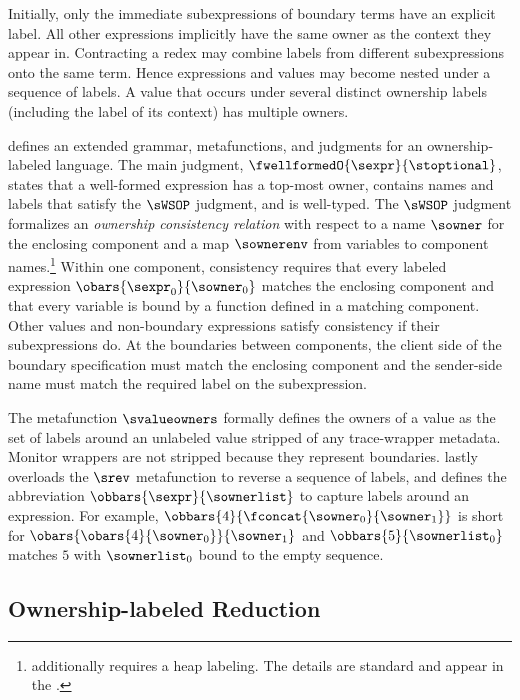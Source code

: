 Initially, only the immediate subexpressions of boundary terms have an explicit label.
All other expressions implicitly have the same owner as the context they appear
in.
Contracting a redex may combine labels from different
subexpressions onto the same term. Hence expressions and values may become
nested under a sequence of labels.  A value that occurs under
several distinct ownership labels (including the label of its context) has
multiple owners.

 defines an extended grammar, metafunctions,
 and judgments for an ownership-labeled language.
The main judgment, $\fwellformedO{\sexpr}{\stoptional}$,
 states that a well-formed expression has a top-most owner,
 contains names and labels that satisfy the $\sWSOP$ judgment,
 and is well-typed.
The $\sWSOP$ judgment formalizes an \emph{ownership consistency relation}\/
 with respect to a name $\sowner$ for the enclosing component and a map
 $\sownerenv$ from variables to component names.\footnote{\Tname{} additionally
 requires a heap labeling. The details are standard and appear in the
 \techreport{}.}
 Within one component, consistency
 requires that every labeled expression $\obars{\sexpr_0}{\sowner_0}$
 matches the enclosing component and that every variable is bound by a
 function defined in a matching component.  Other values and non-boundary
 expressions satisfy consistency if their subexpressions do.  At the
 boundaries between components, the client side of the boundary
 specification must match the enclosing component and the sender-side name
 must match the required label on the subexpression.

The metafunction $\svalueowners$\/ formally defines the owners of a value
 as the set of labels around an unlabeled value stripped of any trace-wrapper
 metadata.
Monitor wrappers are not stripped because they represent boundaries.
 lastly overloads the $\srev$\/ metafunction
 to reverse a sequence of labels, and defines the abbreviation
 $\obbars{\sexpr}{\sownerlist}$ to capture labels around an expression.
For example, $\obbars{4}{\fconcat{\sowner_0}{\sowner_1}}$
 is short for $\obars{\obars{4}{\sowner_0}}{\sowner_1}$
 and $\obbars{5}{\sownerlist_0}$ matches $5$ with $\sownerlist_0$ bound to
 the empty sequence.


\subsection{Ownership-labeled Reduction}

